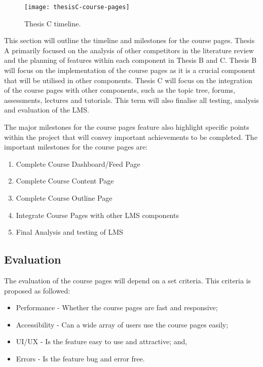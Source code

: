 \begin{figure}[h]
    \centering
    \texttt{[image: thesisC-course-pages]}
    \caption{Thesis C timeline.}
\end{figure}
This section will outline the timeline and milestones for the course pages.
Thesis A primarily focused on the analysis of other competitors in the literature review and the planning of features within each component in Thesis B and C.
Thesis B will focus on the implementation of the course pages as it is a crucial component that will be utilised in other components.
Thesis C will focus on the integration of the course pages with other components, such as the topic tree, forums, assessments, lectures and tutorials.
This term will also finalise all testing, analysis and evaluation of the LMS.

The major milestones for the course pages feature also highlight specific points within the project that will convey important achievements to be completed.
The important milestones for the course pages are:
\begin{enumerate}
    \item Complete Course Dashboard/Feed Page
    \item Complete Course Content Page
    \item Complete Course Outline Page
    \item Integrate Course Pages with other LMS components
    \item Final Analysis and testing of LMS
\end{enumerate}

\subsection{Evaluation}
The evaluation of the course pages will depend on a set criteria.
This criteria is proposed as followed:
\begin{itemize}
    \item Performance - Whether the course pages are fast and responsive;
    \item Accessibility - Can a wide array of users use the course pages easily;
    \item UI/UX - Is the feature easy to use and attractive; and,
    \item Errors - Is the feature bug and error free.
\end{itemize}

